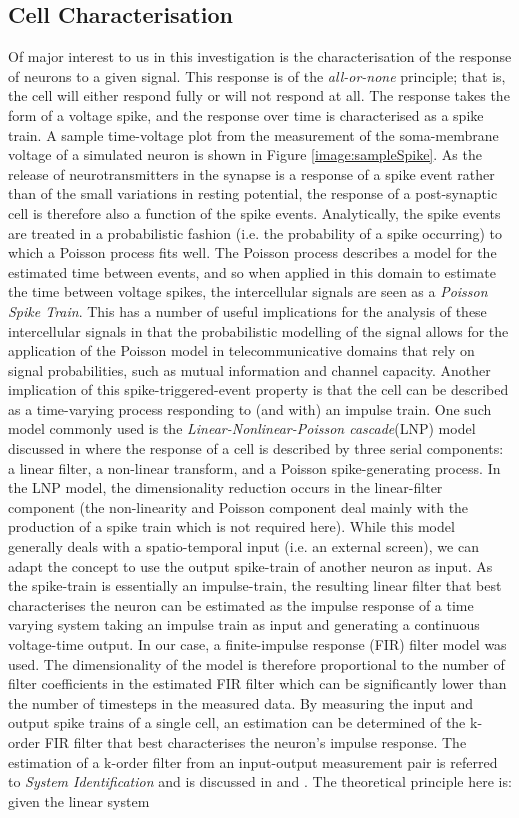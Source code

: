 \documentclass[letterpaper, 10 pt, conference]{ieeeconf}  %
\begin{document}
\subsection*{Cell Characterisation}
Of major interest to us in this investigation is the characterisation of the response of neurons to a given signal. This response is of the \emph{all-or-none} principle; that is, the cell will either respond fully or will not respond at all. The response takes the form of a voltage spike, and the response over time is characterised as a spike train. A sample time-voltage plot from the measurement of the soma-membrane voltage of a simulated neuron is shown in Figure \ref{image:sampleSpike}. As the release of neurotransmitters in the synapse is a response of a spike event rather than of the small variations in resting potential, the response of a post-synaptic cell is therefore also a function of the spike events. Analytically, the spike events are treated in a probabilistic fashion (i.e. the probability of a spike occurring) to which a Poisson process fits well. The Poisson process describes a model for the estimated time between events, and so when applied in this domain to estimate the time between voltage spikes, the intercellular signals are seen as a \emph{Poisson Spike Train}. This has a number of useful implications for the analysis of these intercellular signals in that the probabilistic modelling of the signal allows for the application of the Poisson model in telecommunicative domains that rely on signal probabilities, such as mutual information and channel capacity. Another implication of this spike-triggered-event property is that the cell can be described as a time-varying process responding to (and with) an impulse train. One such model commonly used is the \emph{Linear-Nonlinear-Poisson cascade}(LNP) model discussed in \cite{lnp} where the response of a cell is described by three serial components: a linear filter, a non-linear transform, and a Poisson spike-generating process. In the LNP model, the dimensionality reduction occurs in the linear-filter component (the non-linearity and Poisson component deal mainly with the production of a spike train which is not required here). While this model generally deals with a spatio-temporal input (i.e. an external screen), we can adapt the concept to use the output spike-train of another neuron as input. As the spike-train is essentially an impulse-train, the resulting linear filter that best characterises the neuron can be estimated as the impulse response of a time varying system taking an impulse train as input and generating a continuous voltage-time output. In our case, a finite-impulse response (FIR) filter model was used. The dimensionality of the model is therefore proportional to the number of filter coefficients in the estimated FIR filter which can be significantly lower than the number of timesteps in the measured data. By measuring the input and output spike trains of a single cell, an estimation can be determined of the k-order FIR filter that best characterises the neuron's impulse response. The estimation of a k-order filter from an input-output measurement pair is referred to \emph{System Identification} and is discussed in \cite{sysIdA} and \cite{sysIdB}. The theoretical principle here is: given the linear system 
\end{document}
